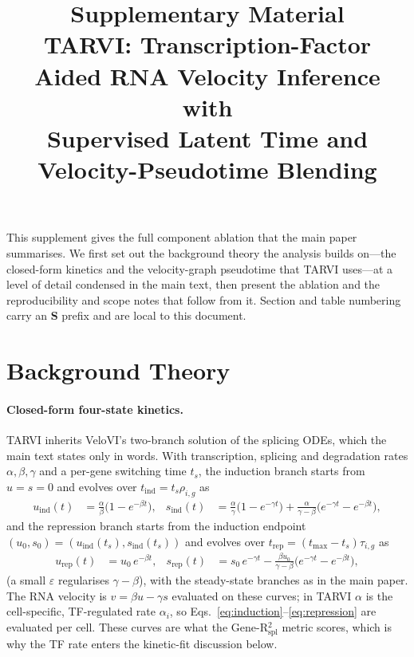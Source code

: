 \documentclass[11pt]{article}
\title{\textbf{Supplementary Material}\\[2pt]
TARVI: Transcription-Factor Aided RNA Velocity Inference with\\
Supervised Latent Time and Velocity-Pseudotime Blending}
\begin{document}
\maketitle

This supplement gives the full component ablation that the main paper summarises. We
first set out the background theory the analysis builds on---the closed-form kinetics
and the velocity-graph pseudotime that TARVI uses---at a level of detail condensed in
the main text, then present the ablation and the reproducibility and scope notes that
follow from it. Section and table numbering carry an \textbf{S} prefix and are local
to this document.

\section{Background Theory}
\label{sec:theory}

\paragraph{Closed-form four-state kinetics.} TARVI inherits VeloVI's two-branch
solution of the splicing ODEs, which the main text states only in words. With
transcription, splicing and degradation rates $\alpha,\beta,\gamma$ and a per-gene
switching time $t_s$, the induction branch starts from $u{=}s{=}0$ and evolves over
$t_{\text{ind}}=t_s\rho_{i,g}$ as
\begin{align}
u_{\text{ind}}(t) &= \tfrac{\alpha}{\beta}\big(1-e^{-\beta t}\big), &
s_{\text{ind}}(t) &= \tfrac{\alpha}{\gamma}\big(1-e^{-\gamma t}\big)
 + \tfrac{\alpha}{\gamma-\beta}\big(e^{-\gamma t}-e^{-\beta t}\big),
\label{eq:induction}
\end{align}
and the repression branch starts from the induction endpoint
$(u_0,s_0)=(u_{\text{ind}}(t_s),s_{\text{ind}}(t_s))$ and evolves over
$t_{\text{rep}}=(t_{\max}-t_s)\tau_{i,g}$ as
\begin{align}
u_{\text{rep}}(t) &= u_0\,e^{-\beta t}, &
s_{\text{rep}}(t) &= s_0\,e^{-\gamma t}
 - \tfrac{\beta u_0}{\gamma-\beta}\big(e^{-\gamma t}-e^{-\beta t}\big),
\label{eq:repression}
\end{align}
(a small $\varepsilon$ regularises $\gamma-\beta$), with the steady-state branches as
in the main paper. The RNA velocity is $v=\beta u-\gamma s$ evaluated on these
curves; in TARVI $\alpha$ is the cell-specific, TF-regulated rate $\alpha_i$, so
Eqs.~\eqref{eq:induction}--\eqref{eq:repression} are evaluated per cell. These curves
are what the Gene-R$^2_\text{spl}$ metric scores, which is why the TF rate enters the
kinetic-fit discussion below.
\end{document}
